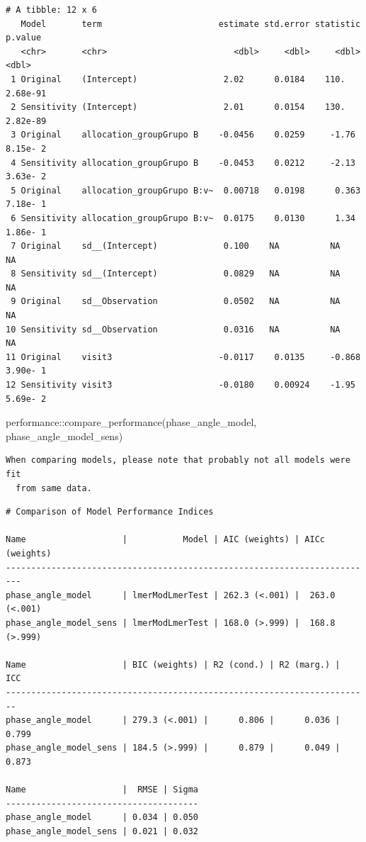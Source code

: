 \documentclass[
  letterpaper,
  DIV=11,
  numbers=noendperiod]{scrartcl}
\newenvironment{Shaded}{\begin{snugshade}}{\end{snugshade}}
\newcommand{\FunctionTok}[1]{\textcolor[rgb]{0.28,0.35,0.67}{#1}}
\newcommand{\NormalTok}[1]{\textcolor[rgb]{0.00,0.23,0.31}{#1}}
\newcommand{\SpecialCharTok}[1]{\textcolor[rgb]{0.37,0.37,0.37}{#1}}
\begin{document}
\begin{verbatim}
# A tibble: 12 x 6
   Model       term                       estimate std.error statistic   p.value
   <chr>       <chr>                         <dbl>     <dbl>     <dbl>     <dbl>
 1 Original    (Intercept)                 2.02      0.0184    110.     2.68e-91
 2 Sensitivity (Intercept)                 2.01      0.0154    130.     2.82e-89
 3 Original    allocation_groupGrupo B    -0.0456    0.0259     -1.76   8.15e- 2
 4 Sensitivity allocation_groupGrupo B    -0.0453    0.0212     -2.13   3.63e- 2
 5 Original    allocation_groupGrupo B:v~  0.00718   0.0198      0.363  7.18e- 1
 6 Sensitivity allocation_groupGrupo B:v~  0.0175    0.0130      1.34   1.86e- 1
 7 Original    sd__(Intercept)             0.100    NA          NA     NA       
 8 Sensitivity sd__(Intercept)             0.0829   NA          NA     NA       
 9 Original    sd__Observation             0.0502   NA          NA     NA       
10 Sensitivity sd__Observation             0.0316   NA          NA     NA       
11 Original    visit3                     -0.0117    0.0135     -0.868  3.90e- 1
12 Sensitivity visit3                     -0.0180    0.00924    -1.95   5.69e- 2
\end{verbatim}

\begin{Shaded}
\begin{Highlighting}[]
\NormalTok{performance}\SpecialCharTok{::}\FunctionTok{compare\_performance}\NormalTok{(phase\_angle\_model, phase\_angle\_model\_sens)}
\end{Highlighting}
\end{Shaded}

\begin{verbatim}
When comparing models, please note that probably not all models were fit
  from same data.
\end{verbatim}

\begin{verbatim}
# Comparison of Model Performance Indices

Name                   |           Model | AIC (weights) | AICc (weights)
-------------------------------------------------------------------------
phase_angle_model      | lmerModLmerTest | 262.3 (<.001) |  263.0 (<.001)
phase_angle_model_sens | lmerModLmerTest | 168.0 (>.999) |  168.8 (>.999)

Name                   | BIC (weights) | R2 (cond.) | R2 (marg.) |   ICC
------------------------------------------------------------------------
phase_angle_model      | 279.3 (<.001) |      0.806 |      0.036 | 0.799
phase_angle_model_sens | 184.5 (>.999) |      0.879 |      0.049 | 0.873

Name                   |  RMSE | Sigma
--------------------------------------
phase_angle_model      | 0.034 | 0.050
phase_angle_model_sens | 0.021 | 0.032
\end{verbatim}
\end{document}
